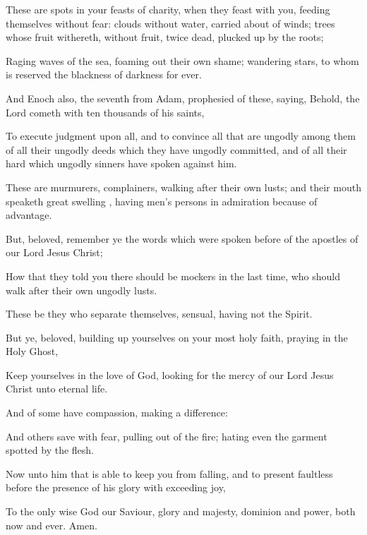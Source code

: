 {These
are
spots
in
your feasts of
charity, when they feast
with
you,
feeding
themselves without
fear:
clouds
{} without
water, carried
about
of
winds;
trees whose fruit
withereth, without
fruit,
twice
dead, plucked up by the
roots;

Raging
waves of the
sea, foaming
out their
own
shame;
wandering
stars, to
whom is
reserved the
blackness of
darkness
for
ever.

And
Enoch
also, the
seventh
from
Adam,
prophesied of
these,
saying,
Behold, the
Lord
cometh
with ten
thousands
of
his
saints,

To
execute
judgment
upon
all,
and to
convince
all that are
ungodly among
them
of
all
their
ungodly
deeds
which they have ungodly
committed,
and
of
all their
hard
{}
which
ungodly
sinners have
spoken
against
him.

These
are
murmurers,
complainers,
walking
after their
own
lusts;
and
their
mouth
speaketh great
swelling
{},
having
men’s persons in
admiration because
of
advantage.


\par }{\PP {}But,
beloved,
remember
ye the
words which were spoken
before
of the
apostles
of
our
Lord
Jesus
Christ;

How
that they
told
you there should
be
mockers
in
the
last
time, who should
walk
after their
own
ungodly
lusts.

These
be they who
separate
themselves,
sensual,
having
not the
Spirit.

But
ye,
beloved, building
up
yourselves
on
your most
holy
faith,
praying
in
the
Holy
Ghost,

Keep
yourselves
in the
love of
God, looking
for the
mercy
of
our
Lord
Jesus
Christ
unto
eternal
life.

And of
some have
compassion, making a
difference:

And
others
save
with
fear,
pulling
{} out
of the
fire;
hating
even the
garment
spotted
by the
flesh.


\par }{\PP {}Now unto him that is
able to
keep
you from
falling,
and to
present
{}
faultless before the
presence
of
his
glory
with exceeding
joy,

To
the
only
wise
God
our
Saviour,
{}
glory
and
majesty,
dominion
and
power,
both
now
and
ever.
Amen.


\par }